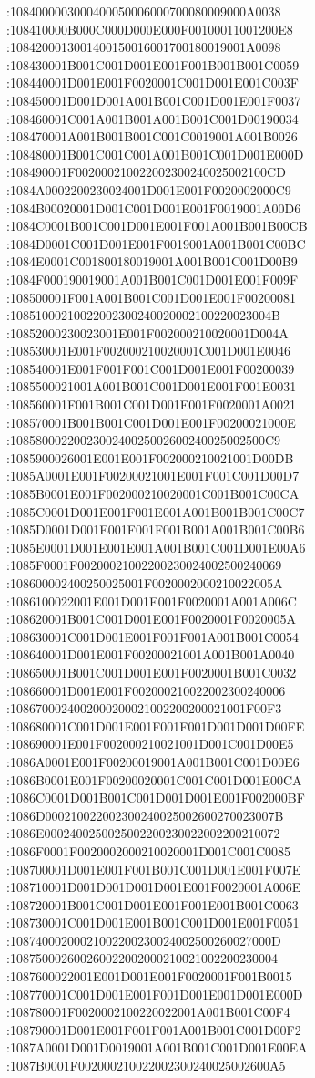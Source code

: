 
:1084000003000400050006000700080009000A0038
:108410000B000C000D000E000F00100011001200E8
:1084200013001400150016001700180019001A0098
:108430001B001C001D001E001F001B001B001C0059
:108440001D001E001F0020001C001D001E001C003F
:108450001D001D001A001B001C001D001E001F0037
:108460001C001A001B001A001B001C001D00190034
:108470001A001B001B001C001C0019001A001B0026
:108480001B001C001C001A001B001C001D001E000D
:108490001F002000210022002300240025002100CD
:1084A0002200230024001D001E001F0020002000C9
:1084B00020001D001C001D001E001F0019001A00D6
:1084C0001B001C001D001E001F001A001B001B00CB
:1084D0001C001D001E001F0019001A001B001C00BC
:1084E0001C001800180019001A001B001C001D00B9
:1084F000190019001A001B001C001D001E001F009F
:108500001F001A001B001C001D001E001F00200081
:10851000210022002300240020002100220023004B
:10852000230023001E001F002000210020001D004A
:108530001E001F002000210020001C001D001E0046
:108540001E001F001F001C001D001E001F00200039
:1085500021001A001B001C001D001E001F001E0031
:108560001F001B001C001D001E001F0020001A0021
:108570001B001B001C001D001E001F00200021000E
:1085800022002300240025002600240025002500C9
:1085900026001E001E001F002000210021001D00DB
:1085A0001E001F00200021001E001F001C001D00D7
:1085B0001E001F002000210020001C001B001C00CA
:1085C0001D001E001F001E001A001B001B001C00C7
:1085D0001D001E001F001F001B001A001B001C00B6
:1085E0001D001E001E001A001B001C001D001E00A6
:1085F0001F00200021002200230024002500240069
:108600002400250025001F0020002000210022005A
:1086100022001E001D001E001F0020001A001A006C
:108620001B001C001D001E001F0020001F0020005A
:108630001C001D001E001F001F001A001B001C0054
:108640001D001E001F00200021001A001B001A0040
:108650001B001C001D001E001F0020001B001C0032
:108660001D001E001F002000210022002300240006
:1086700024002000200021002200200021001F00F3
:108680001C001D001E001F001F001D001D001D00FE
:108690001E001F002000210021001D001C001D00E5
:1086A0001E001F00200019001A001B001C001D00E6
:1086B0001E001F00200020001C001C001D001E00CA
:1086C0001D001B001C001D001D001E001F002000BF
:1086D000210022002300240025002600270023007B
:1086E0002400250025002200230022002200210072
:1086F0001F0020002000210020001D001C001C0085
:108700001D001E001F001B001C001D001E001F007E
:108710001D001D001D001D001E001F0020001A006E
:108720001B001C001D001E001F001E001B001C0063
:108730001C001D001E001B001C001D001E001F0051
:10874000200021002200230024002500260027000D
:108750002600260022002000210021002200230004
:1087600022001E001D001E001F0020001F001B0015
:108770001C001D001E001F001D001E001D001E000D
:108780001F0020002100220022001A001B001C00F4
:108790001D001E001F001F001A001B001C001D00F2
:1087A0001D001D0019001A001B001C001D001E00EA
:1087B0001F002000210022002300240025002600A5
